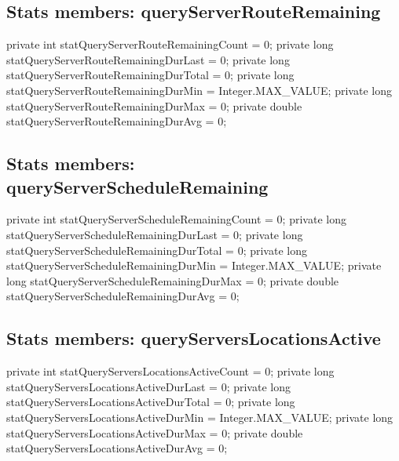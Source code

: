 \subsection{Stats members: queryServerRouteRemaining}
\nwenddocs{}\endmoddef{}
private int    statQueryServerRouteRemainingCount    = 0;
private long   statQueryServerRouteRemainingDurLast  = 0;
private long   statQueryServerRouteRemainingDurTotal = 0;
private long   statQueryServerRouteRemainingDurMin   = Integer.MAX_VALUE;
private long   statQueryServerRouteRemainingDurMax   = 0;
private double statQueryServerRouteRemainingDurAvg   = 0;
\nwendcode{}\nwdocspar

\subsection{Stats members: queryServerScheduleRemaining}
\nwenddocs{}\endmoddef{}
private int    statQueryServerScheduleRemainingCount    = 0;
private long   statQueryServerScheduleRemainingDurLast  = 0;
private long   statQueryServerScheduleRemainingDurTotal = 0;
private long   statQueryServerScheduleRemainingDurMin   = Integer.MAX_VALUE;
private long   statQueryServerScheduleRemainingDurMax   = 0;
private double statQueryServerScheduleRemainingDurAvg   = 0;
\nwendcode{}\nwdocspar

\subsection{Stats members: queryServersLocationsActive}
\nwenddocs{}\endmoddef{}
private int    statQueryServersLocationsActiveCount    = 0;
private long   statQueryServersLocationsActiveDurLast  = 0;
private long   statQueryServersLocationsActiveDurTotal = 0;
private long   statQueryServersLocationsActiveDurMin   = Integer.MAX_VALUE;
private long   statQueryServersLocationsActiveDurMax   = 0;
private double statQueryServersLocationsActiveDurAvg   = 0;
\nwendcode{}\nwdocspar

